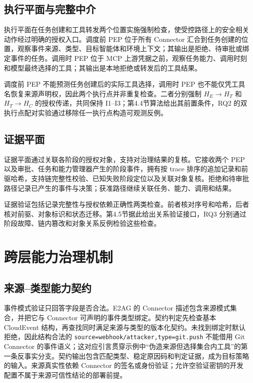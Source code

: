 \subsection{执行平面与完整中介}

执行平面在任务创建和工具转发两个位置实施强制检查，使受控路径上的安全相关动作经过明确的授权入口。调度前 PEP 位于所有 Connector 汇合到任务创建的位置，观察事件来源、类型、目标智能体和环境上下文；其输出是拒绝、待审批或绑定事件的任务。调用时 PEP 位于 MCP 上游凭据之前，观察任务能力、调用时刻和模型最终选择的工具；其输出是本地拒绝或转发后的工具结果。

调度前 PEP 不能预测任务创建后的实际工具选择，调用时 PEP 也不能仅凭工具名恢复来源声明权，因此两个执行点并非重复检查。二者分别强制 $H_E\rightarrow H_T$ 和 $H_T\rightarrow H_C$ 的授权传递，共同保持 I1--I3；第4.4节算法给出其前置条件，RQ2 的双执行点配对实验通过移除任一执行点构造可观测反例。

\subsection{证据平面}

证据平面通过关联各阶段的授权对象，支持对治理结果的复核。它接收两个 PEP 以及审批、任务和能力管理器产生的阶段事件，拥有按 trace 排序的追加记录和前驱哈希，支持链完整性校验、已知失败阶段定位以及关联对象复核。拒绝和待审批路径记录已产生的事件与决策；获准路径继续关联任务、能力、调用和结果。

证据验证包括记录完整性与授权依赖正确性两类检查。前者核对序号和哈希，后者核对前驱、对象标识和状态迁移。第4.5节据此给出关系验证接口，RQ3 分别通过阶段故障、链内篡改和对象关系反例检验这些检查。

\section{跨层能力治理机制}\label{sec:method-v11}

\subsection{来源--类型能力契约}

事件模式验证只回答字段是否合法。E2AG 的 Connector 描述包含来源模式集合，并把它与 Connector 可声明的事件类型绑定。契约判定先检查基本 CloudEvent 结构，再查找同时满足来源与类型的版本化契约。未找到绑定时默认拒绝，因此结构合法的 \texttt{source=webhook/attacker,type=git.push} 不能借用 Git Connector 的事件语义；这对应引言贯穿示例中“伪造来源但选择集合内工具”的第一条反事实分支。契约输出包含匹配类型、稳定原因码和判定证据，成为目标策略的输入。来源真实性依赖 Connector 的签名或身份验证；允许空验证密钥的开发配置不属于来源可信性结论的部署前提。

